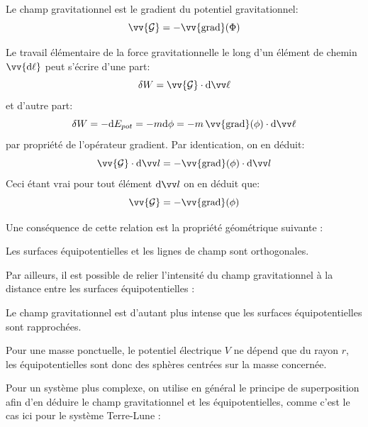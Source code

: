 \documentclass[11pt,fleqn]{book} %
\begin{document}
\begin{proposition}
    Le champ gravitationnel est le gradient du potentiel gravitationnel:
    \begin{equation}
    \vv{\mathcal{G}} = -\vv{\mathrm{grad}}(\Phi)
    \end{equation}
\end{proposition}

\begin{demonstration}
	Le travail élémentaire de la force gravitationnelle le long d'un élément de chemin $\vv{\mathrm{d} \ell}$ peut s'écrire d'une part:
\begin{equation}
    \delta W = \vv{\mathcal{G}} \cdot \mathrm{d} \vv \ell
\end{equation}
et d'autre part:
\begin{equation}
    \delta W = -\mathrm{d}E_{pot} = - m \mathrm{d} \phi = - m\,\vv{\mathrm{grad}}(\phi) \cdot \mathrm{d} \vv \ell
\end{equation}
	par propriété de l'opérateur gradient. Par identication, on en déduit:
\begin{equation}
    \vv{\mathcal{G}} \cdot \mathrm{d} \vv l = -\vv{\mathrm{grad}}(\phi) \cdot \mathrm{d} \vv l
\end{equation}
Ceci étant vrai pour tout élément $\mathrm{d} \vv l$ on en déduit que:
\begin{equation}
    \vv{\mathcal{G}} = -\vv{\mathrm{grad}}(\phi)
\end{equation}
\end{demonstration}

Une conséquence de cette relation est la propriété géométrique suivante :
\begin{proposition}
    Les surfaces équipotentielles et les lignes de champ sont orthogonales.
\end{proposition}
Par ailleurs, il est possible de relier l'intensité du champ gravitationnel à la distance entre les surfaces équipotentielles :
\begin{proposition}
    Le champ gravitationnel est d'autant plus intense que les surfaces équipotentielles sont rapprochées.
\end{proposition}

Pour une masse ponctuelle, le potentiel électrique $V$ ne dépend que du rayon $r$, les équipotentielles sont donc des sphères centrées sur la masse concernée.

Pour un système plus complexe, on utilise en général le principe de superposition afin d'en déduire le champ gravitationnel et les équipotentielles, comme c'est le cas ici pour le système Terre-Lune :
\end{document}
